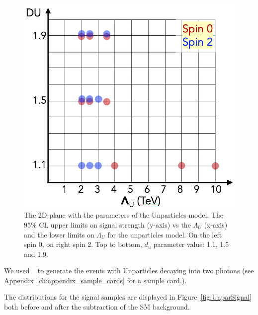 \begin{figure}[!htbp]
	\centering
    \includegraphics[scale=0.3]{fig/Unpar_plane.png}
	\caption{The 2D-plane with the parameters of the Unparticles model.
The 95\% CL upper limits on signal strength (y-axis) vs the $\Lambda_U$ (x-axis) and the lower limits on $\Lambda_U$ for the unparticles model.
On the left spin 0, on right spin 2. Top to bottom, $d_{u}$ parameter value: 1.1, 1.5 and 1.9.}
	\label{fig:UnparticlesSearchSpace}
\end{figure}


We used ~\cite{Sjostrand:2008za} to generate the events with Unparticles decaying into two photons (see Appendix~\ref{ch:appendix_sample_cards} for a sample \PYTHIA card.).

The \mgg distributions for the signal samples are displayed in Figure~\ref{fig:UnparSignal} both before and after the subtraction of the SM background. 


